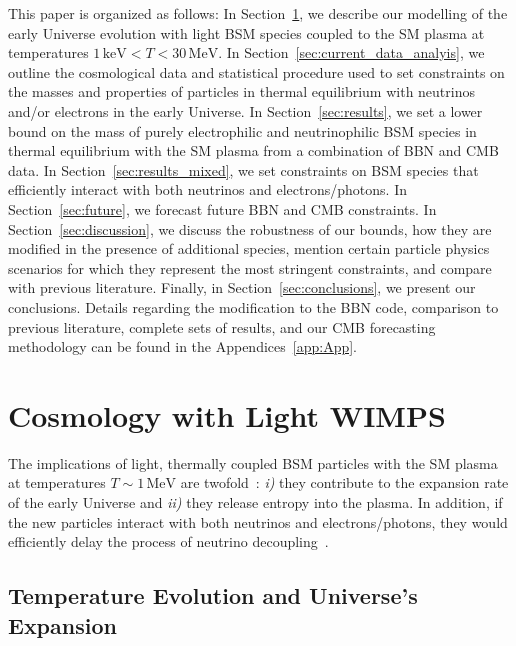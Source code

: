\documentclass[notitlepage,letterpaper,natbib,aps,prd,onecolumn,amsmath,amsfonts,nofootinbib,preprintnumbers,superscriptaddress,secnumarabic,groupedaddress]{revtex4-1}
\begin{document}
This paper is organized as follows: In Section~\ref{sec:earlyUniverse}, we describe our modelling of the early Universe evolution with light BSM species coupled to the SM plasma at temperatures $1\,\text{keV} < T < 30\,\text{MeV}$. In Section~\ref{sec:current_data_analyis}, we outline the cosmological data and statistical procedure used to set constraints on the masses and properties of particles in thermal equilibrium with neutrinos and/or electrons in the early Universe. In Section~\ref{sec:results}, we set a lower bound on the mass of purely electrophilic and neutrinophilic BSM species in thermal equilibrium with the SM plasma from a combination of BBN and CMB data. In Section~\ref{sec:results_mixed}, we set constraints on BSM species that efficiently interact with both neutrinos and electrons/photons. In Section~\ref{sec:future}, we forecast future BBN and CMB constraints. In Section~\ref{sec:discussion}, we discuss the robustness of our bounds, how they are modified in the presence of additional species, mention certain particle physics scenarios for which they represent the most stringent constraints, and compare with previous literature. Finally, in Section~\ref{sec:conclusions}, we present our conclusions. Details regarding the modification to the BBN code, comparison to previous literature, complete sets of results, and our CMB forecasting methodology can be found in the Appendices~\ref{app:App}.



\section{Cosmology with Light WIMPS}\label{sec:earlyUniverse}
The implications of light, thermally coupled BSM particles with the SM plasma at temperatures $T \sim 1 \,\text{MeV}$ are twofold~\cite{Kolb:1986nf}: \textit{i)} they contribute to the expansion rate of the early Universe and \textit{ii)} they release entropy into the plasma.
In addition, if the new particles interact with both neutrinos and electrons/photons, they would efficiently delay the process of neutrino decoupling~\cite{Serpico:2004nm,Escudero:2018mvt}.

\subsection{Temperature Evolution and Universe's Expansion}\label{sec:earlyUniverse_method}
\end{document}
